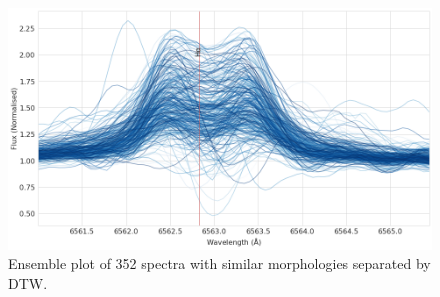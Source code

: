 \begin{figure}[!htb]
\centering
\includegraphics[scale=0.42]{figures/class_11_45.png}
\caption{Ensemble plot of 352 spectra with similar morphologies separated by DTW.}
\end{figure}





